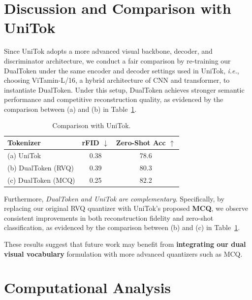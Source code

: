 \section{Discussion and Comparison with UniTok}
\label{appendix_unitok}

Since UniTok adopts a more advanced visual backbone, decoder, and discriminator architecture, we conduct a fair comparison by re-training our DualToken under the same encoder and decoder settings used in UniTok, \textit{i.e.}, choosing ViTamin-L/16, a hybrid architecture of CNN and transformer, to instantiate DualToken.
Under this setup, DualToken achieves stronger semantic performance and competitive reconstruction quality, as evidenced by the comparison between (a) and (b) in Table~\ref{tab:unitok}.


\begin{table}[ht]
\centering
\caption{Comparison with UniTok.}
\label{tab:unitok}
\begin{tabular}{lcc}
\toprule
Tokenizer & rFID $\downarrow$ & Zero-Shot Acc $\uparrow$ \\
\midrule
(a) UniTok              & 0.38 & 78.6 \\
(b) DualToken (RVQ)     & 0.39 & 80.3 \\
(c) DualToken (MCQ)     & 0.25 & 82.2 \\
\bottomrule
\end{tabular}
\end{table}

Furthermore, \emph{DualToken and UniTok are complementary}. Specifically, by replacing our original RVQ quantizer with UniTok’s proposed \textbf{MCQ}, we observe consistent improvements in both reconstruction fidelity and zero-shot classification, as evidenced by the comparison between (b) and (c) in Table~\ref{tab:unitok}.

These results suggest that future work may benefit from \textbf{integrating our dual visual vocabulary} formulation with more advanced quantizers such as MCQ.


\section{Computational Analysis}
\label{appendix_computation}

